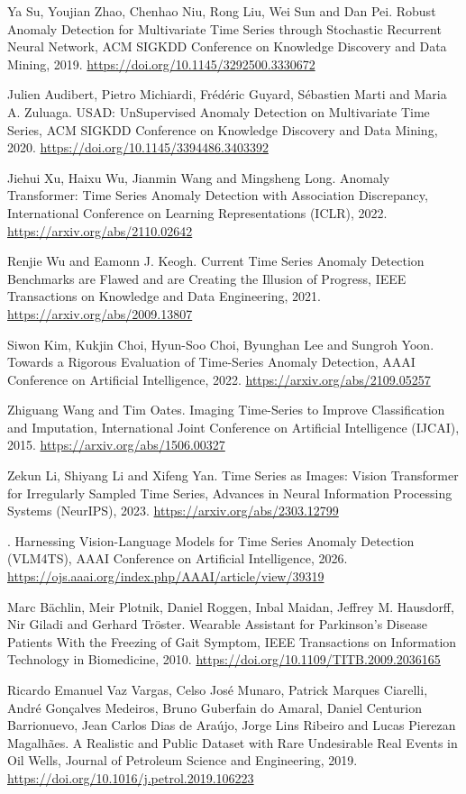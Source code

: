 \documentclass[twoside,english]{article}
\def\bibentry#1{\item[\hbox{[#1]}]}
\begin{document}
\bibentry{Su19} Ya Su, Youjian Zhao, Chenhao Niu, Rong Liu, Wei Sun and Dan Pei. Robust Anomaly Detection for Multivariate Time Series through Stochastic Recurrent Neural Network, ACM SIGKDD Conference on Knowledge Discovery and Data Mining, 2019. \url{https://doi.org/10.1145/3292500.3330672}
\bibentry{Audibert20} Julien Audibert, Pietro Michiardi, Fr\'ed\'eric Guyard, S\'ebastien Marti and Maria A. Zuluaga. USAD: UnSupervised Anomaly Detection on Multivariate Time Series, ACM SIGKDD Conference on Knowledge Discovery and Data Mining, 2020. \url{https://doi.org/10.1145/3394486.3403392}
\bibentry{Xu22} Jiehui Xu, Haixu Wu, Jianmin Wang and Mingsheng Long. Anomaly Transformer: Time Series Anomaly Detection with Association Discrepancy, International Conference on Learning Representations (ICLR), 2022. \url{https://arxiv.org/abs/2110.02642}
\bibentry{Wu21} Renjie Wu and Eamonn J. Keogh. Current Time Series Anomaly Detection Benchmarks are Flawed and are Creating the Illusion of Progress, IEEE Transactions on Knowledge and Data Engineering, 2021. \url{https://arxiv.org/abs/2009.13807}
\bibentry{Kim22} Siwon Kim, Kukjin Choi, Hyun-Soo Choi, Byunghan Lee and Sungroh Yoon. Towards a Rigorous Evaluation of Time-Series Anomaly Detection, AAAI Conference on Artificial Intelligence, 2022. \url{https://arxiv.org/abs/2109.05257}
\bibentry{Wang15} Zhiguang Wang and Tim Oates. Imaging Time-Series to Improve Classification and Imputation, International Joint Conference on Artificial Intelligence (IJCAI), 2015. \url{https://arxiv.org/abs/1506.00327}
\bibentry{Li23} Zekun Li, Shiyang Li and Xifeng Yan. Time Series as Images: Vision Transformer for Irregularly Sampled Time Series, Advances in Neural Information Processing Systems (NeurIPS), 2023. \url{https://arxiv.org/abs/2303.12799}
\bibentry{VLM4TS} [Verify author list before submission]. Harnessing Vision-Language Models for Time Series Anomaly Detection (VLM4TS), AAAI Conference on Artificial Intelligence, 2026. \url{https://ojs.aaai.org/index.php/AAAI/article/view/39319}
\bibentry{Bachlin10} Marc B\"achlin, Meir Plotnik, Daniel Roggen, Inbal Maidan, Jeffrey M. Hausdorff, Nir Giladi and Gerhard Tr\"oster. Wearable Assistant for Parkinson's Disease Patients With the Freezing of Gait Symptom, IEEE Transactions on Information Technology in Biomedicine, 2010. \url{https://doi.org/10.1109/TITB.2009.2036165}
\bibentry{Vargas19} Ricardo Emanuel Vaz Vargas, Celso Jos\'e Munaro, Patrick Marques Ciarelli, Andr\'e Gon\c{c}alves Medeiros, Bruno Guberfain do Amaral, Daniel Centurion Barrionuevo, Jean Carlos Dias de Ara\'ujo, Jorge Lins Ribeiro and Lucas Pierezan Magalh\~aes. A Realistic and Public Dataset with Rare Undesirable Real Events in Oil Wells, Journal of Petroleum Science and Engineering, 2019. \url{https://doi.org/10.1016/j.petrol.2019.106223}
\end{document}
